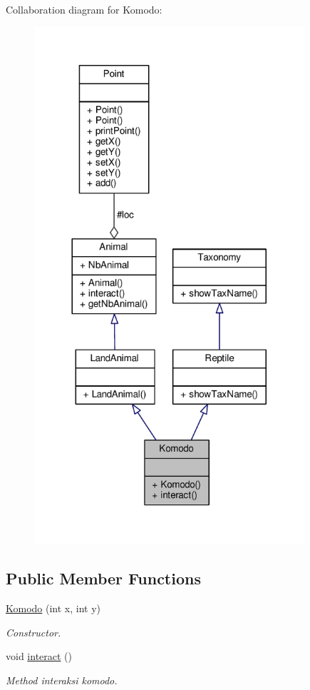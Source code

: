Collaboration diagram for Komodo\+:
\nopagebreak
\begin{figure}[H]
\begin{center}
\leavevmode
\includegraphics[width=284pt]{classKomodo__coll__graph}
\end{center}
\end{figure}
\subsection*{Public Member Functions}
\begin{DoxyCompactItemize}
\item 
\hyperlink{classKomodo_ac7791dee74b98e5a3b9b091aaafc1c78}{Komodo} (int x, int y)
\begin{DoxyCompactList}\small\item\em Constructor. \end{DoxyCompactList}\item 
void \hyperlink{classKomodo_a091e8c0374220bb60e86d55e52470efb}{interact} ()\hypertarget{classKomodo_a091e8c0374220bb60e86d55e52470efb}{}\label{classKomodo_a091e8c0374220bb60e86d55e52470efb}

\begin{DoxyCompactList}\small\item\em Method interaksi komodo. \end{DoxyCompactList}\end{DoxyCompactItemize}
